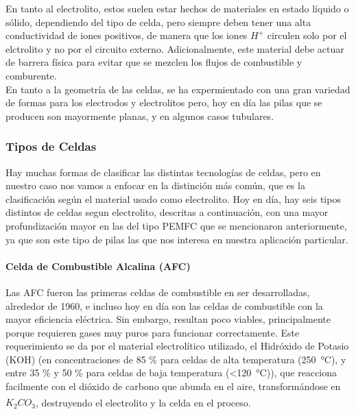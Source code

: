 En tanto al electrolito, estos suelen estar hechos de materiales en estado líquido o sólido, dependiendo del tipo de celda, pero siempre deben tener una alta conductividad de iones positivos, de manera que los iones $H^{+}$ circulen solo por el elctrolito y no por el circuito externo. Adicionalmente, este material debe actuar de barrera física para evitar que se mezclen los flujos de combustible y comburente.\\

En tanto a la geometría de las celdas, se ha expermientado con una gran variedad de formas para los electrodos y electrolitos pero, hoy en día las pilas que se producen son mayormente planas, y en algunos casos tubulares.\\

\subsubsection{Tipos de Celdas}\label{tipos_celdas}

Hay muchas formas de clasificar las distintas tecnologías de celdas, pero en nuestro caso nos vamos a enfocar en la distinción más común, que es la clasificación según el material usado como electrolito. Hoy en día, hay seis tipos distintos de celdas segun electrolito, descritas a continuación, con una mayor profundización mayor en las del tipo PEMFC que se mencionaron anteriormente, ya que son este tipo de pilas las que nos interesa en nuestra aplicación particular.\\

\paragraph{Celda de Combustible Alcalina (AFC)}

Las AFC fueron las primeras celdas de combustible en ser desarrolladas, alrededor de 1960, e incluso hoy en día son las celdas de combustible con la mayor eficiencia eléctrica. Sin embargo, resultan poco viables, principalmente porque requieren gases muy puros para funcionar correctamente. Este requerimiento se da por el material electrolítico utilizado, el Hidróxido de Potasio (KOH) (en concentraciones de 85 \% para celdas de alta temperatura (\SI{250}{\celsius}), y entre 35 \% y 50 \% para celdas de baja temperatura (<\SI{120}{\celsius})), que reacciona facilmente con el dióxido de carbono que abunda en el aire, transformándose en $K_2CO_3$, destruyendo el electrolito y la celda en el proceso.\textsuperscript{\cite{FC-FundAndAppl}\cite{FCHandbook}}\\

